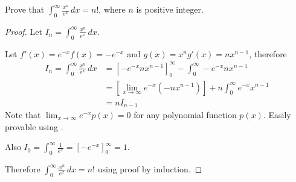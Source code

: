 \begin{exec}
  Prove that $\int_{0}^{\infty}\frac{x^n}{e^{x}}\,dx = n!$, where $n$ is positive integer.
  \tcblower
  \begin{proof}
  Let $I_n = \int_{0}^{\infty}\frac{x^n}{e^{x}}\,dx$.

  Let $f'(x)=e^{-x}$\g$f(x)=-e^{-x}$ and $g(x)=x^n$\g$g'(x)=nx^{n-1}$, therefore
  \begin{align*}
    I_n = \int_{0}^{\infty}\frac{x^n}{e^{x}}\,dx
      &= \left[-e^{-x}nx^{n-1}\right]^{\infty}_{0} - \int_{0}^{\infty}-e^{-x}nx^{n-1} \\
      &= \left[\lim_{x\rightarrow\infty}e^{-x}(-nx^{n-1})\right] + n\int_{0}^{\infty}e^{-x}x^{n-1} \\
      &= nI_{n-1}
  \end{align*}
  Note that $\lim_{x\rightarrow\infty}e^{-x}p(x)=0$ for any polynomial function $p(x)$. Easily provable using .

  Also $I_{0}=\int^{\infty}_{0}\frac{1}{e^x}=\left[-e^{-x}\right]^{\infty}_{0}=1$.

  Therefore $\int_{0}^{\infty}\frac{x^n}{e^{x}}\,dx=n!$ using proof by induction.
  \end{proof}
\end{exec}